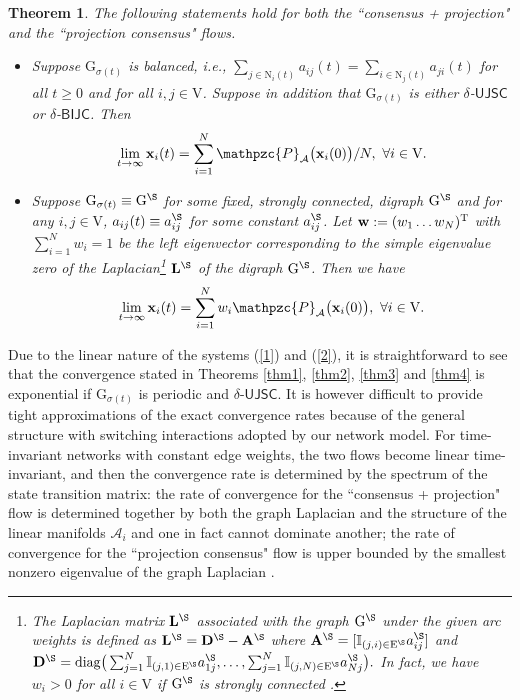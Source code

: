 \documentclass[a4paper, 11pt]{article}
\def\T{^{\rm\tiny T}}
\newtheorem{theorem}{Theorem}
\begin{document}
\begin{theorem}\label{prop1} The following statements hold for both the ``consensus + projection" and the ``projection consensus" flows.
\begin{itemize}
\item[(i)] Suppose $\mathrm{G}_{\sigma(t)}$ is balanced, i.e., $\sum_{j\in \mathrm{N}_i(t)} a_{ij}(t)=\sum_{i\in\mathrm{N}_j(t)}a_{ji}(t)$ for all $t\geq 0$ and  for all $i,j\in\mathrm{V}$. Suppose in addition  that $\mathrm{G}_{\sigma(t)}$ is either  $\delta$-$\mathsf{UJSC}$ or $\delta$-$\mathsf{BIJC}$. Then
$$
\lim_{t\to\infty} \mathbf{x}_i(t)=\sum_{i=1}^N \mathpzc{P}_{\mathcal{A}}\big(\mathbf{x}_i(0)\big)/N, \ \forall i\in\mathrm{V}.
$$
\item[(ii)] Suppose $\mathrm{G}_{\sigma(t)}\equiv\mathrm{G}^\S$ for some fixed, strongly connected, digraph $\mathrm{G}^\S$ and for any $i,j\in\mathrm{V}$, $a_{ij}(t)\equiv a_{ij}^\S$ for some constant $a_{ij}^\S$.  Let $\mathbf{w}:=(w_1 \dots w_N)\T$ with $\sum_{i=1}^N w_i=1$ be the left eigenvector  corresponding to the simple eigenvalue zero of the Laplacian\footnote{The Laplacian matrix $\mathbf{L}^\S$ associated with the graph $\mathrm{G}^\S$ under the given arc weights is defined as $\mathbf{L}^\S=\mathbf{D}^\S-\mathbf{A}^\S$ where $
\mathbf{A}^\S=[\mathbb{I}_{(j,i)\in\mathrm{E}^\S}a_{ij}^\S]
$ and $
\mathbf{D}^\S={\rm diag}\big(\sum_{j=1}^N \mathbb{I}_{(j,1)\in\mathrm{E}^\S}a_{1j}^\S, \dots, \sum_{j=1}^N \mathbb{I}_{(j,N)\in\mathrm{E}^\S}a_{Nj}^\S\big).
$ In fact, we have $w_i>0$ for all $i\in \mathrm{V}$ if $\mathrm{G}^\S$ is strongly connected \cite{magnusbook}.} $\mathbf{L}^\S$ of the digraph $\mathrm{G}^\S$.
Then we have
$$
\lim_{t\to\infty} \mathbf{x}_i(t)=\sum_{i=1}^N w_i\mathpzc{P}_{\mathcal{A}}\big(\mathbf{x}_i(0)\big),\  \forall i\in\mathrm{V}.
$$

\end{itemize}
\end{theorem}



 Due to the linear nature of the systems (\ref{1}) and (\ref{2}), it is straightforward to see that  the convergence stated in Theorems \ref{thm1}, \ref{thm2}, \ref{thm3} and \ref{thm4} is   exponential if $\mathrm{G}_{\sigma(t)}$ is periodic and  $\delta$-$\mathsf{UJSC}$. It is however difficult to provide tight approximations of the exact convergence rates because of the general  structure with switching interactions adopted by our network model. For time-invariant networks with constant edge weights, the two flows become linear time-invariant,  and then  the convergence rate is determined by the spectrum of the state transition matrix: the rate of convergence for the  ``consensus + projection" flow is determined together by both the graph Laplacian and the structure of the linear manifolds $\mathcal{A}_i$ and one in fact cannot dominate another;  the rate of convergence for the ``projection consensus" flow is upper bounded by the smallest nonzero eigenvalue of the graph Laplacian \cite{brian15}.
\end{document}
